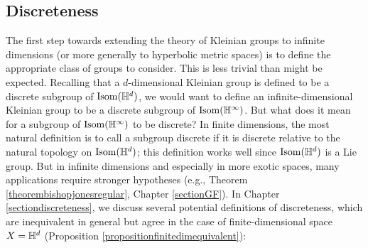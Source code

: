 



\subsection{Discreteness}
\label{subsubsectiondiscreteness}

The first step towards extending the theory of Kleinian groups to infinite dimensions (or more generally to hyperbolic metric spaces) is to define the appropriate class of groups to consider. This is less trivial than might be expected. Recalling that a $d$-dimensional Kleinian group is defined to be a discrete subgroup of $\Isom(\H^d)$, we would want to define an infinite-dimensional Kleinian group to be a discrete subgroup of $\Isom(\H^\infty)$. But what does it mean for a subgroup of $\Isom(\H^\infty)$ to be discrete? In finite dimensions, the most natural definition is to call a subgroup discrete if it is discrete relative to the natural topology on $\Isom(\H^d)$; this definition works well since $\Isom(\H^d)$ is a Lie group. But in infinite dimensions and especially in more exotic spaces, many applications require stronger hypotheses (e.g., Theorem \ref{theorembishopjonesregular}, Chapter \ref{sectionGF}). In Chapter \ref{sectiondiscreteness}, we discuss several potential definitions of discreteness, which are inequivalent in general but agree in the case of finite-dimensional space $X = \H^d$ (Proposition \ref{propositionfinitedimequivalent}):

